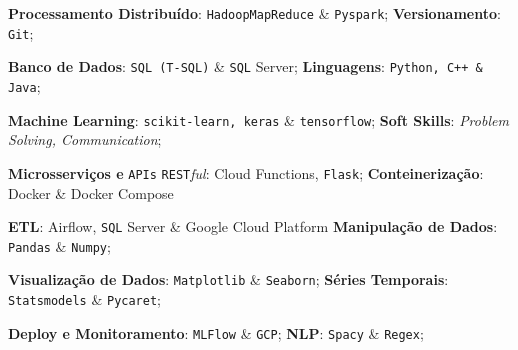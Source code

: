 \documentclass[letterpaper,11pt]{article}
\newcommand{\resumeSubHeadingListStart}{\begin{itemize}[leftmargin=*]}
\newcommand{\resumeSubHeadingListEnd}{\end{itemize}}
\begin{document}
 \resumeSubHeadingListStart
    \color{gray}
    \small{
        \item {\textbf{Processamento Distribuído}: \texttt{HadoopMapReduce} \& \texttt{Pyspark};}
            \hspace{20pt} \textbf{Versionamento}: \texttt{Git};
        \item{
         {{\textbf{Banco de Dados}: \texttt{SQL (T-SQL)} \& \texttt{SQL} Server;}
            \hspace{90pt}\textbf{Linguagens}: \texttt{Python, C++ \& Java};}
        }
        \item{
        {{\textbf{Machine Learning}: \texttt{scikit-learn, keras} \& \texttt{tensorflow};
            \hspace{29pt} \textbf{Soft Skills}: \textit{Problem Solving, Communication};}}
        \item{\textbf{Microsserviços e} \texttt{APIs} \texttt{REST}\textit{ful}: {Cloud Functions, \texttt{Flask}};
            \hspace{39pt} \textbf{Conteinerização}: Docker \& Docker Compose}
        }
        \item{ \textbf{ETL}: Airflow, \texttt{SQL} Server \& Google Cloud Platform
            \hspace{67pt} \textbf{Manipulação de Dados}: \texttt{Pandas} \& \texttt{Numpy};}
        \item{\textbf{Visualização de Dados}: \texttt{Matplotlib} \& \texttt{Seaborn};
            \hspace{71pt} \textbf{Séries Temporais}: \texttt{Statsmodels} \& \texttt{Pycaret};}
        \item{\textbf{Deploy e Monitoramento}: \texttt{MLFlow} \& \texttt{GCP};
            \hspace{99pt} \textbf{NLP}: \texttt{Spacy} \& \texttt{Regex};}
    }
 \resumeSubHeadingListEnd
 
\end{document}
